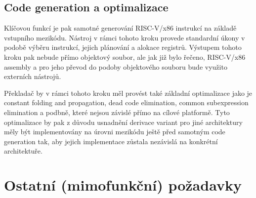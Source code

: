 \documentclass{article}
\begin{document}
\subsection{Code generation a optimalizace}

Klíčovou funkcí je pak samotné generování RISC-V/x86 instrukcí na základě vstupního mezikódu. Nástroj v rámci tohoto kroku provede standardní úkony v podobě výběru instrukcí, jejich plánování a alokace registrů. Výstupem tohoto kroku pak nebude přímo objektový soubor, ale jak již bylo řečeno, RISC-V/x86 assembly a pro jeho převod do podoby objektového souboru bude využito externích nástrojů.

Překladač by v rámci tohoto kroku měl provést také základní optimalizace jako je constant folding and propagation, dead code elimination, common subexpression elimination a podbně, které nejsou závislé přímo na cílové platformě. Tyto optimalizace by pak z důvodu usnadnění derivace variant pro jiné architektury měly být implementovány na úrovni mezikódu ještě před samotným code generation tak, aby jejich implementace zůstala nezávislá na konkrétní architektuře. 

\section{Ostatní (mimofunkční) požadavky}
\end{document}
